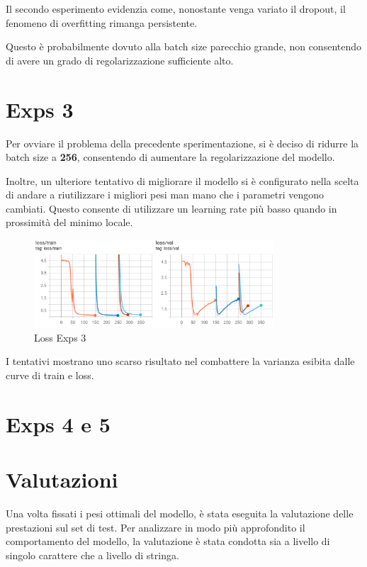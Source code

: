 Il secondo esperimento evidenzia come, nonostante venga variato il dropout, il fenomeno di overfitting rimanga persistente.

Questo è probabilmente dovuto alla batch size parecchio grande, non consentendo di avere un grado di regolarizzazione sufficiente alto.


\section{Exps 3}

Per ovviare il problema della precedente sperimentazione, si è deciso di ridurre la batch size a \textbf{256}, consentendo di aumentare la regolarizzazione del modello.

Inoltre, un ulteriore tentativo di migliorare il modello si è configurato nella scelta di andare a riutilizzare i migliori pesi man mano che i parametri vengono cambiati. Questo consente di utilizzare un learning rate più basso quando in prossimità del minimo locale.

\begin{figure}[htbp]
    \centering
    \includegraphics[width=0.8\textwidth]{images/exps3_loss.png}
    \caption{Loss Exps 3}
    \label{fig:exps1_loss}
\end{figure}

I tentativi mostrano uno scarso risultato nel combattere la varianza esibita dalle curve di train e loss.


\section{Exps 4 e 5}



\section{Valutazioni}
Una volta fissati i pesi ottimali del modello, è stata eseguita la valutazione delle prestazioni sul set di test. Per analizzare in modo più approfondito il comportamento del modello, la valutazione è stata condotta sia a livello di singolo carattere che a livello di stringa.

